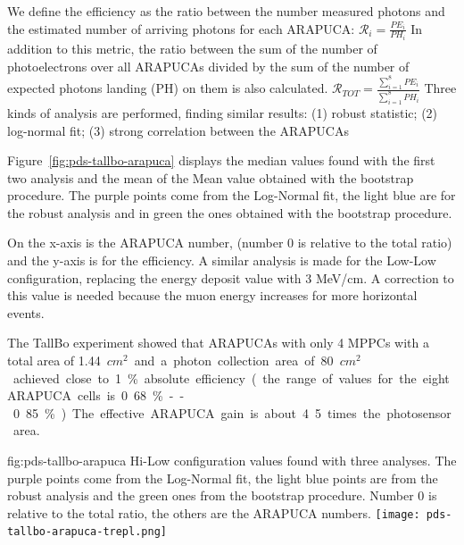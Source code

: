 We define the efficiency as the ratio between the number measured photons and the estimated number of arriving photons for each ARAPUCA:
$\mathcal{R}_{i}=\frac{PE_i}{PH_i}$
In addition to this metric, the ratio between the sum of the number of photoelectrons over all ARAPUCAs divided by the sum of the number of expected photons landing (PH) on them is also calculated. 
$\mathcal{R}_{TOT}=\frac{\sum_{i=1}^8PE_i}{\sum_{i=1}^8PH_i}$
Three kinds of analysis are performed, finding similar results:
(1) robust statistic; (2) log-normal fit; (3) strong correlation between the ARAPUCAs

Figure~\ref{fig:pds-tallbo-arapuca} displays the median values found with the first two analysis and the mean of the Mean value obtained with the bootstrap procedure.
The purple points come from the Log-Normal fit, the light blue are for the robust analysis and in green the ones obtained with the bootstrap procedure.

On the x-axis is the ARAPUCA number, (number 0 is relative to the total ratio) and the y-axis is
for the efficiency. A similar analysis is made for the Low-Low configuration, replacing the energy deposit value with 3 MeV/cm. A correction to this value is needed because the muon energy increases for more horizontal events.

The TallBo experiment showed that ARAPUCAs with only 4 MPPCs with a total area of \SI{1.44}{$cm^2$} and a photon collection area of \SI{80}{$cm^2$} achieved close to 1\% absolute efficiency (the range of values for the eight ARAPUCA cells is 0.68\%--0.85\%). The effective ARAPUCA gain is about 4.5 times the photosensor area.

\begin{dunefigure}
 {fig:pds-tallbo-arapuca}
 {Hi-Low configuration values found with three analyses. The purple points come
from the Log-Normal fit, the light blue points are from the robust analysis and the green ones from
the bootstrap procedure. Number 0 is relative to the total ratio, the others are the ARAPUCA
numbers.}
\texttt{[image: pds-tallbo-arapuca-trepl.png]}
\end{dunefigure}


